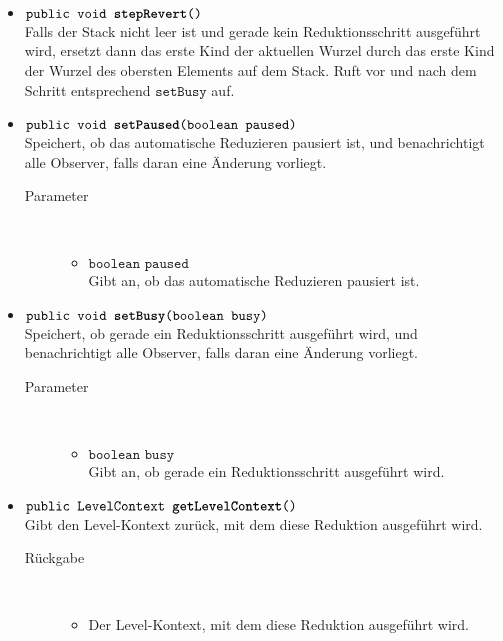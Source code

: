 \begin{description}
\begin{itemize}
		\item $\texttt{public void \textbf{stepRevert}()}$ \\ Falls der Stack nicht leer ist und gerade kein Reduktionsschritt ausgeführt wird, ersetzt dann das erste Kind der aktuellen Wurzel durch das erste Kind der Wurzel des obersten Elements auf dem Stack. Ruft vor und nach dem Schritt entsprechend $\texttt{setBusy}$ auf.
		
		\item $\texttt{public void \textbf{setPaused}(boolean paused)}$ \\ Speichert, ob das automatische Reduzieren pausiert ist, und benachrichtigt alle Observer, falls daran eine Änderung vorliegt.
		\begin{description}
			\item[Parameter] \hfill \\
			\vspace{-.8cm}
			\begin{itemize}
				\item $\texttt{boolean paused}$ \\ Gibt an, ob das automatische Reduzieren pausiert ist.
			\end{itemize}
		\end{description}
		
		\item $\texttt{public void \textbf{setBusy}(boolean busy)}$ \\ Speichert, ob gerade ein Reduktionsschritt ausgeführt wird, und benachrichtigt alle Observer, falls daran eine Änderung vorliegt.
		\begin{description}
			\item[Parameter] \hfill \\
			\vspace{-.8cm}
			\begin{itemize}
				\item $\texttt{boolean busy}$ \\ Gibt an, ob gerade ein Reduktionsschritt ausgeführt wird.
			\end{itemize}
		\end{description}
		
		\item $\texttt{public LevelContext \textbf{getLevelContext}()}$ \\ Gibt den Level-Kontext zurück, mit dem diese Reduktion ausgeführt wird.
		\begin{description}
			\item[Rückgabe] \hfill \\
			\vspace{-.8cm}
			\begin{itemize}
				\item Der Level-Kontext, mit dem diese Reduktion ausgeführt wird.
			\end{itemize}
		\end{description}
	\end{itemize}
\end{description}

